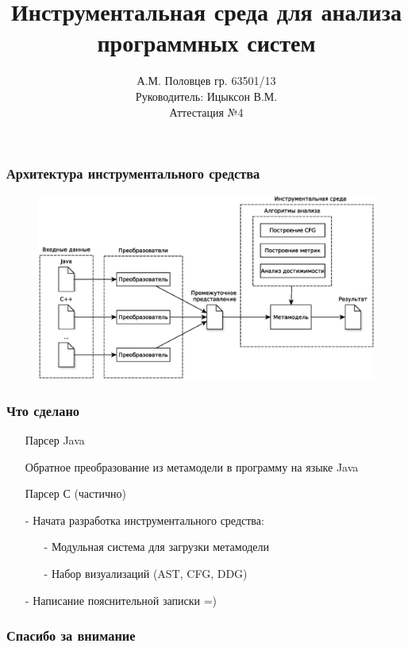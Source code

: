 \documentclass{beamer}
\title[Инструментальная среда]
{Инструментальная среда для анализа программных систем}
\author[А.М. Половцев]{
    А.М. Половцев гр. 63501/13\\
    Руководитель: Ицыксон В.М.\\
    Аттестация №4
}
\date[\today]{}
\begin{document}
\frame{\titlepage}

\begin{frame}
\frametitle{Архитектура инструментального средства}

\begin{figure}[h!]
    \begin{center}
        \includegraphics[width=\textwidth]{img/architecture.eps}
    \end{center}
\end{figure}
\end{frame}

\begin{frame}
\frametitle{Что сделано}
    \begin{itemize}
        \item[\checkmark] Парсер Java
        \item[\checkmark] Обратное преобразование из метамодели в программу на языке Java
        \item[\checkmark] Парсер С (частично)
        \item[-] Начата разработка инструментального средства:
            \begin{itemize}
                \item[-] Модульная система для загрузки метамодели
                \item[-] Набор визуализаций (AST, CFG, DDG)
            \end{itemize}
        \item[-] Написание пояснительной записки =)
    \end{itemize}
\end{frame}

\begin{frame}
\frametitle{Спасибо за внимание}
\end{frame}
\end{document}
